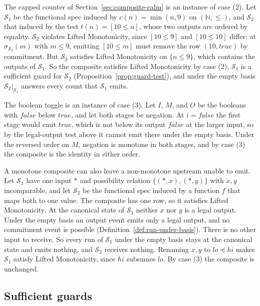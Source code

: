 \documentclass[sigconf]{cidr-2027}
\theoremstyle{remark}
\newcommand{\commitment}{commitment\xspace}
\begin{document}
The capped counter of Section~\ref{sec:composite-calm} is an instance of case
(2). Let $\mathcal S_1$ be the functional spec induced by $c(n)=\min(n,9)$ on
$(\mathbb N,\le)$, and $\mathcal S_2$ that induced by the test $t(n)=[10\le
n]$, whose two outputs are ordered by equality. $\mathcal S_2$ violates
Lifted Monotonicity, since $[10\le 9]$ and $[10\le 10]$ differ: at
$\sigma_{\mathcal S_2}(m)$ with $m\le 9$, emitting $[10\le m]$ must remove the
row $(10,\mathit{true})$ by \commitment. But $\mathcal S_2$ satisfies Lifted
Monotonicity on $\{n\le 9\}$, which contains the outputs of $\mathcal S_1$. So the composite satisfies Lifted Monotonicity by case (2), $\mathcal S_1$ is a
sufficient guard for $\mathcal S_2$ (Proposition~\ref{prop:guard-test}), and under the empty basis
$\mathcal S_2|_{\mathcal S_1}$ answers every count that $\mathcal S_1$ emits.

The boolean toggle is an instance of case (3). Let $I$, $M$, and $O$ be the
booleans with $\mathit{false}$ below $\mathit{true}$, and let both stages be
negation. At $i=\mathit{false}$ the first stage would emit $\mathit{true}$,
which is not below its output $\mathit{false}$ at the larger input, so by the
legal-output test above it cannot emit there under the empty basis. Under the
reversed order on $M$, negation is monotone in both stages, and by case (3)
the composite is the identity in either order.

A monotone composite can also leave a non-monotone upstream unable to emit. Let $\mathcal S_1$ have one input $*$ and possibility relation
$\{(*,x),(*,y)\}$ with $x,y$ incomparable, and let $\mathcal S_2$ be the
functional spec induced by a function $f$ that maps both to one value. The
composite has one row, so it satisfies Lifted Monotonicity. At the canonical
state of $\mathcal S_1$ neither $x$ nor $y$ is a legal output. Under the
empty basis an output event emits only a legal output, and no \commitment
event is possible (Definition~\ref{def:run-under-basis}). There is no other
input to receive. So every run of $\mathcal S_1$ under the empty basis stays at the canonical
state and emits nothing, and $\mathcal S_2$ receives nothing. Renaming $x,y$
to $\mathit{lo}\preceq\mathit{hi}$ makes $\mathcal S_1$ satisfy Lifted
Monotonicity, since $\mathit{hi}$ subsumes $\mathit{lo}$. By case (3) the
composite is unchanged.

\subsection{Sufficient guards}
\end{document}
